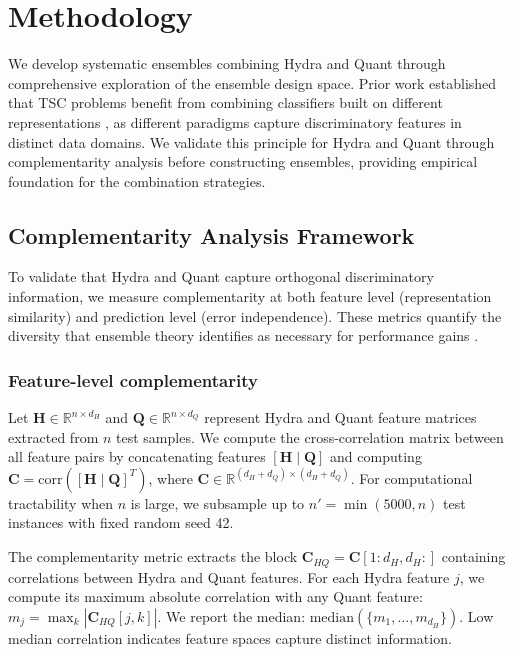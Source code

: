 \documentclass[pdflatex,sn-basic]{sn-jnl}           %
\theoremstyle{thmstyleone}%
\theoremstyle{thmstyletwo}%
\theoremstyle{thmstylethree}%
\begin{document}
\section{Methodology}\label{sec3}

We develop systematic ensembles combining Hydra and Quant through comprehensive exploration of the ensemble design space. Prior work established that TSC problems benefit from combining classifiers built on different representations \citep[p.~3213]{hive-cote-2}, as different paradigms capture discriminatory features in distinct data domains. We validate this principle for Hydra and Quant through complementarity analysis before constructing ensembles, providing empirical foundation for the combination strategies.

\subsection{Complementarity Analysis Framework}\label{subsec:complementarity}

To validate that Hydra and Quant capture orthogonal discriminatory information, we measure complementarity at both feature level (representation similarity) and prediction level (error independence). These metrics quantify the diversity that ensemble theory identifies as necessary for performance gains \citep{stacked-generalization}.

\subsubsection{Feature-level complementarity} 

Let $\mathbf{H} \in \mathbb{R}^{n \times d_H}$ and $\mathbf{Q} \in \mathbb{R}^{n \times d_Q}$ represent Hydra and Quant feature matrices extracted from $n$ test samples. We compute the cross-correlation matrix between all feature pairs by concatenating features $[\mathbf{H} \mid \mathbf{Q}]$ and computing $\mathbf{C} = \text{corr}([\mathbf{H} \mid \mathbf{Q}]^T)$, where $\mathbf{C} \in \mathbb{R}^{(d_H + d_Q) \times (d_H + d_Q)}$. For computational tractability when $n$ is large, we subsample up to $n' = \min(5000, n)$ test instances with fixed random seed 42.

The complementarity metric extracts the block $\mathbf{C}_{HQ} = \mathbf{C}[1{:}d_H, d_H{:}]$ containing correlations between Hydra and Quant features. For each Hydra feature $j$, we compute its maximum absolute correlation with any Quant feature: $m_j = \max_k |\mathbf{C}_{HQ}[j,k]|$. We report the median: $\text{median}(\{m_1, \ldots, m_{d_H}\})$. Low median correlation indicates feature spaces capture distinct information.
\end{document}
